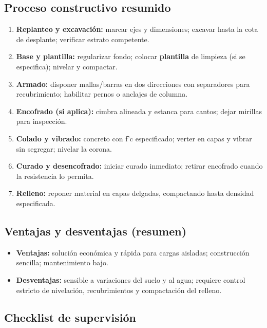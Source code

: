 \documentclass[12pt]{article}
\begin{document}
	\subsection*{Proceso constructivo resumido}
	\begin{enumerate}[leftmargin=*, itemsep=2pt]
		\item \textbf{Replanteo y excavación:} marcar ejes y dimensiones; excavar hasta la cota de desplante; verificar estrato competente.
		\item \textbf{Base y plantilla:} regularizar fondo; colocar \textbf{plantilla} de limpieza (si se especifica); nivelar y compactar.
		\item \textbf{Armado:} disponer mallas/barras en dos direcciones con separadores para recubrimiento; habilitar pernos o anclajes de columna.
		\item \textbf{Encofrado (si aplica):} cimbra alineada y estanca para cantos; dejar mirillas para inspección.
		\item \textbf{Colado y vibrado:} concreto con f’c especificado; verter en capas y vibrar sin segregar; nivelar la corona.
		\item \textbf{Curado y desencofrado:} iniciar curado inmediato; retirar encofrado cuando la resistencia lo permita.
		\item \textbf{Relleno:} reponer material en capas delgadas, compactando hasta densidad especificada.
	\end{enumerate}
	
	\subsection*{Ventajas y desventajas (resumen)}
	\begin{itemize}[leftmargin=*, itemsep=2pt]
		\item \textbf{Ventajas:} solución económica y rápida para cargas aisladas; construcción sencilla; mantenimiento bajo.
		\item \textbf{Desventajas:} sensible a variaciones del suelo y al agua; requiere control estricto de nivelación, recubrimientos y compactación del relleno.
	\end{itemize}
	
	\subsection{Checklist de supervisión}
	
\end{document}
